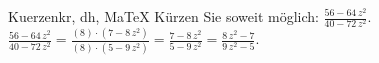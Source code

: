 \begin{MAufgabe}{Kuerzen}{kr, dh, MaTeX}
K\"urzen Sie soweit m\"oglich: $\frac{56 - 64\, z^2}{40 - 72\, z^2}$.\\ 
\ifLsg\MLoesung
\quad $\frac{56 - 64\, z^2}{40 - 72\, z^2}=\frac{(8)\cdot(7 - 8\, z^2)}{(8)\cdot(5 - 9\, z^2)}=\frac{7 - 8\, z^2}{5 - 9\, z^2}=\frac{8\, z^2 - 7}{9\, z^2 - 5}$.\else\relax\fi
 \end{MAufgabe}